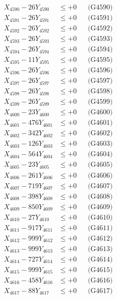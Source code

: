 \documentclass[a4paper,10pt]{article}
\begin{document}
{\begin{align}
X_{4590} - 26Y_{4590} &\leq +0 && \text{(G4590)} \\
\allowbreak
X_{4591} - 26Y_{4591} &\leq +0 && \text{(G4591)} \\
X_{4592} - 26Y_{4592} &\leq +0 && \text{(G4592)} \\
X_{4593} - 26Y_{4593} &\leq +0 && \text{(G4593)} \\
X_{4594} - 26Y_{4594} &\leq +0 && \text{(G4594)} \\
X_{4595} - 11Y_{4595} &\leq +0 && \text{(G4595)} \\
X_{4596} - 26Y_{4596} &\leq +0 && \text{(G4596)} \\
X_{4597} - 26Y_{4597} &\leq +0 && \text{(G4597)} \\
X_{4598} - 26Y_{4598} &\leq +0 && \text{(G4598)} \\
X_{4599} - 26Y_{4599} &\leq +0 && \text{(G4599)} \\
X_{4600} - 23Y_{4600} &\leq +0 && \text{(G4600)} \\
\allowbreak
X_{4601} - 476Y_{4601} &\leq +0 && \text{(G4601)} \\
X_{4602} - 342Y_{4602} &\leq +0 && \text{(G4602)} \\
X_{4603} - 126Y_{4603} &\leq +0 && \text{(G4603)} \\
X_{4604} - 564Y_{4604} &\leq +0 && \text{(G4604)} \\
X_{4605} - 23Y_{4605} &\leq +0 && \text{(G4605)} \\
X_{4606} - 261Y_{4606} &\leq +0 && \text{(G4606)} \\
X_{4607} - 719Y_{4607} &\leq +0 && \text{(G4607)} \\
X_{4608} - 398Y_{4608} &\leq +0 && \text{(G4608)} \\
X_{4609} - 850Y_{4609} &\leq +0 && \text{(G4609)} \\
X_{4610} - 27Y_{4610} &\leq +0 && \text{(G4610)} \\
\allowbreak
X_{4611} - 917Y_{4611} &\leq +0 && \text{(G4611)} \\
X_{4612} - 999Y_{4612} &\leq +0 && \text{(G4612)} \\
X_{4613} - 999Y_{4613} &\leq +0 && \text{(G4613)} \\
X_{4614} - 727Y_{4614} &\leq +0 && \text{(G4614)} \\
X_{4615} - 999Y_{4615} &\leq +0 && \text{(G4615)} \\
X_{4616} - 458Y_{4616} &\leq +0 && \text{(G4616)} \\
X_{4617} - 88Y_{4617} &\leq +0 && \text{(G4617)} \\

\end{align}}
\end{document}
